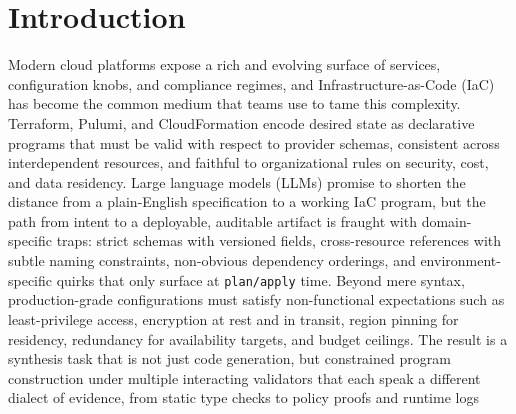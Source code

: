 \documentclass[manuscript,screen,nonacm]{acmart}
\begin{document}

\maketitle




\section{Introduction}

Modern cloud platforms expose a rich and evolving surface of services, configuration knobs, and compliance regimes, and Infrastructure-as-Code (IaC) \cite{rahman2019systematic} has become the common medium that teams use to tame this complexity. Terraform, Pulumi, and CloudFormation encode desired state as declarative programs that must be valid with respect to provider schemas, consistent across interdependent resources, and faithful to organizational rules on security, cost, and data residency. Large language models (LLMs) \cite{chang2024survey} promise to shorten the distance from a plain-English specification to a working IaC program, but the path from intent to a deployable, auditable artifact is fraught with domain-specific traps: strict schemas with versioned fields, cross-resource references with subtle naming constraints, non-obvious dependency orderings, and environment-specific quirks that only surface at \texttt{plan/apply} time. Beyond mere syntax, production-grade configurations must satisfy non-functional expectations such as least-privilege access, encryption at rest and in transit, region pinning for residency, redundancy for availability targets, and budget ceilings. The result is a synthesis task that is not just code generation, but constrained program construction under multiple interacting validators that each speak a different dialect of evidence, from static type checks to policy proofs and runtime logs
\end{document}

